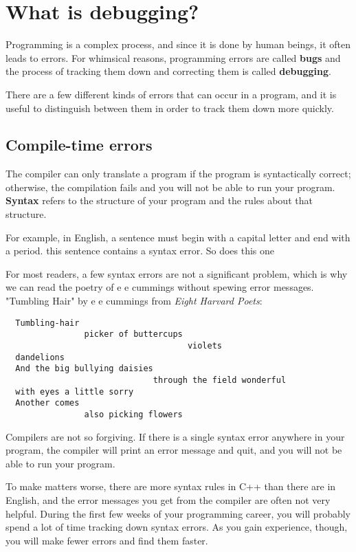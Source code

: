 \section{What is debugging?}

Programming is a complex process, and since it is done by
human beings, it often leads to errors.  For whimsical reasons,
programming errors are called {\bf bugs} and the process
of tracking them down and correcting them is called
{\bf debugging}.

There are a few different kinds of errors that can occur
in a program, and it is useful to distinguish between them
in order to track them down more quickly.

\subsection{Compile-time errors}

The compiler can only translate a program if the program is
syntactically correct; otherwise, the compilation fails and
you will not be able to run your program.  {\bf Syntax}
refers to the structure of your program and the rules about
that structure.


For example, in English, a sentence must begin with a capital
letter and end with a period.  this sentence contains a syntax
error.  So does this one

For most readers, a few syntax errors are not a significant
problem, which is why we can read the poetry of e e cummings
without spewing error messages.\
\\
"Tumbling Hair" by e e cummings from {\em Eight Harvard Poets}:
\begin{verbatim}
  Tumbling-hair
                picker of buttercups
                                     violets
  dandelions
  And the big bullying daisies
                              through the field wonderful
  with eyes a little sorry
  Another comes
                also picking flowers
\end{verbatim}

Compilers are not so forgiving.  If there is a single syntax
error anywhere in your program, the compiler will print an
error message and quit, and you will not be able to run
your program.

To make matters worse, there are more syntax rules in C++
than there are in English, and the error messages you get from
the compiler are often not very helpful.  During the first
few weeks of your programming career, you will probably
spend a lot of time tracking down syntax errors.  As you
gain experience, though, you will make fewer errors and find
them faster.

